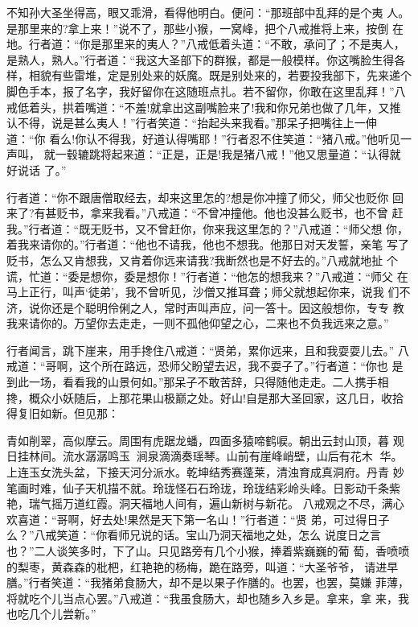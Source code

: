 不知孙大圣坐得高，眼又乖滑，看得他明白。便问：“那班部中乱拜的是个夷
人。是那里来的?拿上来！”说不了，那些小猴，一窝峰，把个八戒推将上来，按倒
在地。行者道：“你是那里来的夷人？”八戒低着头道：“不敢，承问了；不是夷人，
是熟人，熟人。”行者道：“我这大圣部下的群猴，都是一般模样。你这嘴脸生得各
样，相貌有些雷堆，定是别处来的妖魔。既是别处来的，若要投我部下，先来递个
脚色手本，报了名字，我好留你在这随班点扎。若不留你，你敢在这里乱拜！”八
戒低着头，拱着嘴道：“不羞!就拿出这副嘴脸来了!我和你兄弟也做了几年，又推
认不得，说是甚么夷人！”行者笑道：“抬起头来我看。”那呆子把嘴往上一伸道：“你
看么!你认不得我，好道认得嘴耶！”行者忍不住笑道：“猪八戒。”他听见一声叫，
就一毂辘跳将起来道：“正是，正是!我是猪八戒！”他又思量道：“认得就好说话
了。”

行者道：“你不跟唐僧取经去，却来这里怎的?想是你冲撞了师父，师父也贬你
回来了?有甚贬书，拿来我看。”八戒道：“不曾冲撞他。他也没甚么贬书，也不曾
赶我。”行者道：“既无贬书，又不曾赶你，你来我这里怎的？”八戒道：“师父想
你，着我来请你的。”行者道：“他也不请我，他也不想我。他那日对天发誓，亲笔
写了贬书，怎么又肯想我，又肯着你远来请我?我断然也是不好去的。”八戒就地扯
个谎，忙道：“委是想你，委是想你！”行者道：“他怎的想我来？”八戒道：“师父
在马上正行，叫声‘徒弟’，我不曾听见，沙僧又推耳聋；师父就想起你来，说我
们不济，说你还是个聪明伶俐之人，常时声叫声应，问一答十。因这般想你，专专
教我来请你的。万望你去走走，一则不孤他仰望之心，二来也不负我远来之意。”

行者闻言，跳下崖来，用手搀住八戒道：“贤弟，累你远来，且和我耍耍儿去。”
八戒道：“哥啊，这个所在路远，恐师父盼望去迟，我不耍子了。”行者道：“你也
是到此一场，看看我的山景何如。”那呆子不敢苦辞，只得随他走走。二人携手相
搀，概众小妖随后，上那花果山极巅之处。好山!自是那大圣回家，这几日，收拾
得复旧如新。但见那：

青如削翠，高似摩云。周围有虎踞龙蟠，四面多猿啼鹤唳。朝出云封山顶，暮
观日挂林间。流水潺潺鸣玉，涧泉滴滴奏瑶琴。山前有崖峰峭壁，山后有花木
华。上连玉女洗头盆，下接天河分派水。乾坤结秀赛蓬莱，清浊育成真洞府。丹青
妙笔画时难，仙子天机描不就。玲珑怪石石玲珑，玲珑结彩岭头峰。日影动千条紫
艳，瑞气摇万道红霞。洞天福地人间有，遍山新树与新花。
八戒观之不尽，满心欢喜道：“哥啊，好去处!果然是天下第一名山！”行者道：“贤
弟，可过得日子么？”八戒笑道：“你看师兄说的话。宝山乃洞天福地之处，怎么
说度日之言也？”二人谈笑多时，下了山。只见路旁有几个小猴，捧着紫巍巍的葡
萄，香喷喷的梨枣，黄森森的枇杷，红艳艳的杨梅，跪在路旁，叫道：“大圣爷爷，
请进早膳。”行者笑道：“我猪弟食肠大，却不是以果子作膳的。也罢，也罢，莫嫌
菲薄，将就吃个儿当点心罢。”八戒道：“我虽食肠大，却也随乡入乡是。拿来，拿
来，我也吃几个儿尝新。”

